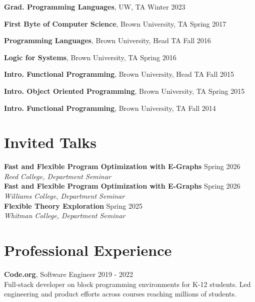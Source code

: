 \documentclass[margin, 10pt]{res} %
\begin{document}
\begin{resume}
{\textbf{Grad. Programming Languages}}, UW, TA \hfill Winter 2023

{\textbf{First Byte of Computer Science}}, Brown University, TA \hfill Spring 2017

{\textbf{Programming Languages}}, Brown University, Head TA \hfill Fall 2016

{\textbf{Logic for Systems}}, Brown University, TA \hfill Spring 2016

{\textbf{Intro. Functional Programming}}, Brown University, Head TA \hfill Fall 2015

{\textbf{Intro. Object Oriented Programming}}, Brown University, TA \hfill Spring 2015

{\textbf{Intro. Functional Programming}}, Brown University, TA \hfill Fall 2014


\section{Invited Talks}
{\textbf{Fast and Flexible Program Optimization with E-Graphs}} \hfill Spring 2026 \\
\textit{Reed College, Department Seminar} \\

{\textbf{Fast and Flexible Program Optimization with E-Graphs}} \hfill Spring 2026 \\
\textit{Williams College, Department Seminar} \\

{\textbf{Flexible Theory Exploration}} \hfill Spring 2025 \\
\textit{Whitman College, Department Seminar}


\section{Professional Experience}
{\textbf{Code.org}, Software Engineer} \hfill 2019 - 2022 \\
Full-stack developer on block programming environments for K-12 students. Led engineering and product efforts across courses reaching millions of students. \\


\end{resume}
\end{document}
